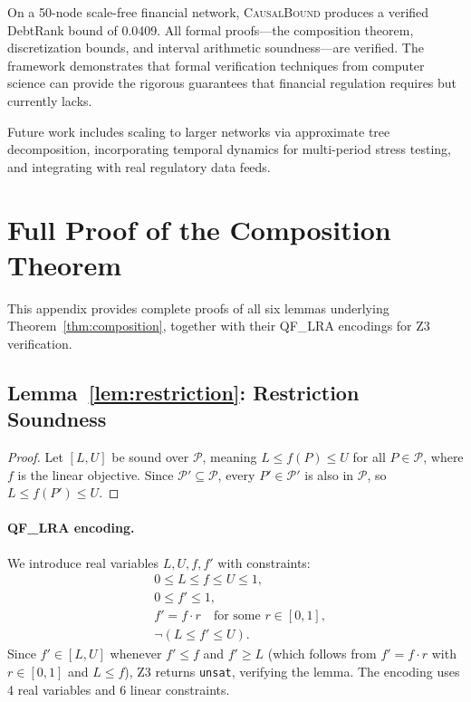 \documentclass[11pt,a4paper]{article}
\newcommand{\calP}{\mathcal{P}}
\newcommand{\CausalBound}{\textsc{CausalBound}}
\begin{document}
On a 50-node scale-free financial network, \CausalBound{} produces a verified DebtRank bound of 0.0409. All formal proofs---the composition theorem, discretization bounds, and interval arithmetic soundness---are verified. The framework demonstrates that formal verification techniques from computer science can provide the rigorous guarantees that financial regulation requires but currently lacks.

Future work includes scaling to larger networks via approximate tree decomposition, incorporating temporal dynamics for multi-period stress testing, and integrating with real regulatory data feeds.

\appendix

\section{Full Proof of the Composition Theorem}
\label{app:composition}

This appendix provides complete proofs of all six lemmas underlying Theorem~\ref{thm:composition}, together with their QF\_LRA encodings for Z3 verification.

\subsection{Lemma~\ref{lem:restriction}: Restriction Soundness}

\begin{proof}
Let $[L, U]$ be sound over $\calP$, meaning $L \leq f(P) \leq U$ for all $P \in \calP$, where $f$ is the linear objective. Since $\calP' \subseteq \calP$, every $P' \in \calP'$ is also in $\calP$, so $L \leq f(P') \leq U$.
\end{proof}

\paragraph{QF\_LRA encoding.} We introduce real variables $L, U, f, f'$ with constraints:
\begin{align}
&0 \leq L \leq f \leq U \leq 1, \label{eq:restrict-1} \\
&0 \leq f' \leq 1, \label{eq:restrict-2} \\
&f' = f \cdot r \quad \text{for some } r \in [0, 1], \label{eq:restrict-3} \\
&\neg(L \leq f' \leq U). \label{eq:restrict-neg}
\end{align}
Since $f' \in [L, U]$ whenever $f' \leq f$ and $f' \geq L$ (which follows from $f' = f \cdot r$ with $r \in [0,1]$ and $L \leq f$), Z3 returns \texttt{unsat}, verifying the lemma. The encoding uses 4 real variables and 6 linear constraints.
\end{document}
